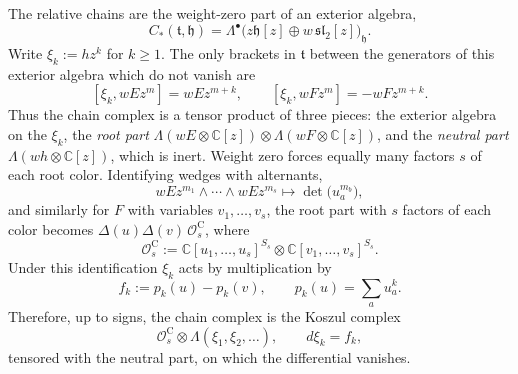 \documentclass[11pt]{amsart}
\numberwithin{equation}{section}
\theoremstyle{definition}
\theoremstyle{remark}
\newcommand{\C}{\mathbb{C}}
\newcommand{\sltwo}{\mathfrak{sl}_2}
\newcommand{\hh}{\mathfrak{h}}
\newcommand{\tl}{\mathfrak{t}}
\newcommand{\cO}{\mathcal{O}}
\newcommand{\Car}{\mathrm{C}}
\begin{document}
The relative chains are the weight-zero part of an exterior algebra,
\begin{equation}\label{eq:Cartan-chains}
C_*(\tl,\hh)=\Lambda^\bullet\bigl(z\hh[z]\oplus w\,\sltwo[z]\bigr)_{\hh}.
\end{equation} Write $\xi_k:=hz^k$ for $k\ge1$. The only brackets in $\tl$ between the generators of this exterior algebra which do not vanish are
\begin{equation}\label{eq:Cartan-brackets}
[\xi_k,wEz^m]=wEz^{m+k},\qquad [\xi_k,wFz^m]=-wFz^{m+k}.
\end{equation}
Thus the chain complex is a tensor product of three pieces: the exterior algebra on the $\xi_k$, the \emph{root part} $\Lambda(wE\otimes\C[z])\otimes\Lambda(wF\otimes\C[z])$, and the \emph{neutral part} $\Lambda(wh\otimes\C[z])$, which is inert. Weight zero forces equally many factors $s$ of each root color. Identifying wedges with alternants,
\begin{equation}\label{eq:alternant}
wEz^{m_1}\wedge\cdots\wedge wEz^{m_s}\longmapsto\det\bigl(u_a^{m_b}\bigr),
\end{equation}
and similarly for $F$ with variables $v_1,\dots,v_s$, the root part with $s$ factors of each color becomes $\Delta(u)\Delta(v)\,\cO^\Car_s$, where
\begin{equation}\label{eq:OCar}
\cO^\Car_s:=\C[u_1,\dots,u_s]^{S_s}\otimes\C[v_1,\dots,v_s]^{S_s}.
\end{equation}
Under this identification $\xi_k$ acts by multiplication by
\begin{equation}\label{eq:fk}
f_k:=p_k(u)-p_k(v),\qquad p_k(u)=\textstyle\sum_au_a^k .
\end{equation}
Therefore, up to signs, the chain complex is the Koszul complex
\begin{equation}\label{eq:koszul}
\cO^\Car_s\otimes\Lambda(\xi_1,\xi_2,\ldots),\qquad d\xi_k=f_k,
\end{equation}
tensored with the neutral part, on which the differential vanishes.
\end{document}
